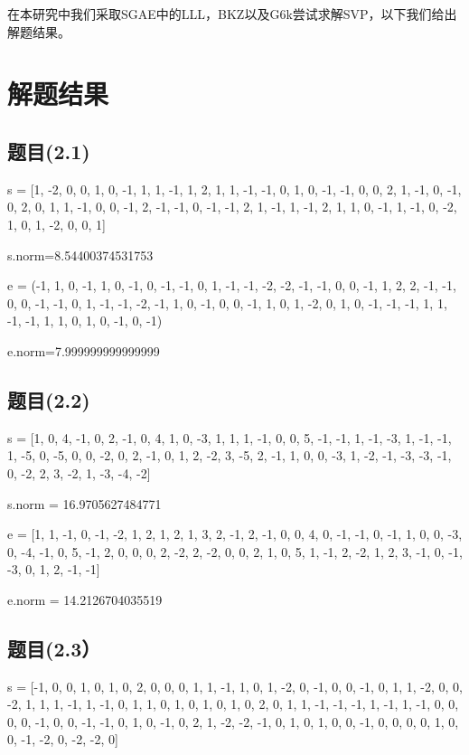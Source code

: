 \documentclass[12pt,a4paper]{article}
\numberwithin{equation}{section}
\begin{document}
在本研究中我们采取SGAE中的LLL，BKZ以及G6k尝试求解SVP，以下我们给出解题结果。

\section{解题结果}

\subsection{题目(2.1)}

s = [1, -2, 0, 0, 1, 0, -1, 1, 1, -1, 1, 2, 1, 1,
-1, -1, 0, 1, 0, -1, -1, 0, 0, 2, 1, -1, 0, -1, 0, 2, 0, 1,
1, -1, 0, 0, -1, 2, -1, -1, 0, -1, -1, 2, 1, -1, 1, -1, 2, 1, 1, 0,
-1, 1, -1, 0, -2, 1, 0, 1, -2, 0, 0, 1]

s.norm=8.54400374531753

\hspace*{\fill}

e = (-1, 1, 0, -1, 1, 0, -1, 0, -1, -1, 0, 1, -1, -1, -2, -2, -1, -1, 0, 0, -1, 1, 2, 2, -1,
-1, 0, 0, -1, -1, 0, 1, -1, -1, -2, -1, 1, 0, -1, 0, 0, -1, 1, 0, 1, -2, 0, 1, 0, -1, -1,
-1, 1, 1, -1, -1, 1, 1, 0, 1, 0, -1, 0, -1)

e.norm=7.999999999999999

\subsection{题目(2.2)}

s = [1, 0, 4, -1, 0, 2, -1, 0, 4, 1, 0, -3, 1, 1, 1, -1, 0, 0, 5, -1, -1, 1, -1, -3, 1, -1, -1, 1, -5, 0, -5, 0, 0, -2, 0, 2, -1, 0, 1, 2, -2, 3, -5, 2, -1, 1, 0, 0, -3, 1, -2, -1, -3, -3, -1, 0, -2, 2, 3, -2, 1, -3, -4, -2]

s.norm = 16.9705627484771

e = [1, 1, -1, 0, -1, -2, 1, 2, 1, 2, 1, 3, 2, -1, 2, -1, 0, 0, 4, 0, -1, -1, 0, -1, 1, 0, 0, -3, 0, -4, -1, 0, 5, -1, 2, 0, 0, 0, 2, -2, 2, -2, 0, 0, 2, 1, 0, 5, 1, -1, 2, -2, 1, 2, 3, -1, 0, -1, -3, 0, 1, 2, -1, -1]

e.norm = 14.2126704035519

\subsection{题目(2.3）}

s = [-1, 0, 0, 1, 0, 1, 0, 2, 0, 0, 0, 1, 1, -1, 1, 0, 1, -2, 0, -1, 0, 0, -1, 0, 1, 1, -2, 0, 0, -2, 1, 1, 1, -1, 1, -1, 0, 1, 1, 0, 1, 0, 1, 0, 1, 0, 2, 0, 1, 1, -1, -1, -1, 1, -1, 1, -1, 0, 0, 0, 0, -1, 0, 0, -1, -1, 0, 1, 0, -1, 0, 2, 1, -2, -2, -1, 0, 1, 0, 1, 0, 0, -1, 0, 0, 0, 0, 1, 0, 0, -1, -2, 0, -2, -2, 0]
\end{document}
